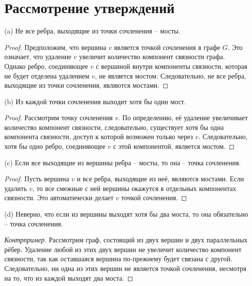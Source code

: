
\section*{Рассмотрение утверждений}

\begin{proposition}
(a) Не все ребра, выходящие из точки сочленения – мосты.
\end{proposition}

\begin{proof}
Предположим, что вершина $v$ является точкой сочленения в графе $G$.
Это означает, что удаление $v$ увеличит количество компонент связности графа. 
Однако ребро, соединяющее $v$ с вершиной внутри компоненты связности, которая не будет отделена удалением $v$, не является мостом. 
Следовательно, не все ребра, выходящие из точки сочленения, являются мостами.
\end{proof}

\begin{proposition}
(b) Из каждой точки сочленения выходит хотя бы один мост.
\end{proposition}

\begin{proof}
Рассмотрим точку сочленения $v$. 
По определению, её удаление увеличивает количество компонент связности, 
следовательно, существует хотя бы одна компонента связности, доступ к которой возможен только через $v$. 
Следовательно, хотя бы одно ребро, соединяющее $v$ с этой компонентой, является мостом.
\end{proof}

\begin{proposition}
(c) Если все выходящие из вершины ребра – мосты, то она – точка сочленения.
\end{proposition}

\begin{proof}
Пусть вершина $v$ и все ребра, выходящие из неё, являются мостами.
Если удалить $v$, то все смежные с ней вершины окажутся в отдельных компонентах связности. 
Это автоматически делает $v$ точкой сочленения.
\end{proof}

\begin{proposition}
(d) Неверно, что если из вершины выходят хотя бы два моста, то она обязательно – точка сочленения.
\end{proposition}

\begin{proof}[Контрпример]
Рассмотрим граф, состоящий из двух вершин и двух параллельных рёбер. 
Удаление любой из этих двух вершин не увеличит количество компонент связности, так как оставшаяся вершина по-прежнему будет связана с другой. 
Следовательно, ни одна из этих вершин не является точкой сочленения, несмотря на то, что из каждой выходят два моста.
\end{proof}

